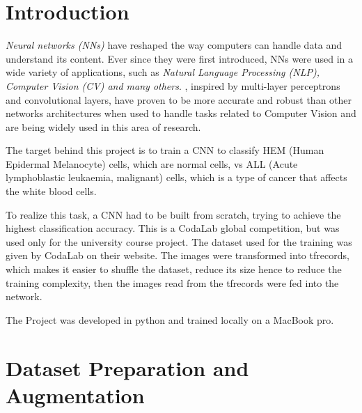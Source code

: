 \documentclass{article}
\begin{document}
\begin{adjustwidth}{-40pt}{-40pt}
\section{Introduction}

{\textit{Neural networks (NNs)}} have reshaped the way computers can handle data and understand its content. Ever since they were first introduced, NNs were used in a wide variety of applications, such as {\textit{Natural Language Processing (NLP), Computer Vision (CV) and many others}}. {}, inspired by multi-layer perceptrons and convolutional layers, have proven to be more  accurate and robust than other networks architectures when used to handle tasks related to Computer Vision and are being widely used in this area of research.

The target behind this project is to train a CNN to classify HEM (Human Epidermal Melanocyte) cells, which are normal cells, vs ALL (Acute lymphoblastic leukaemia, malignant) cells, which is a type of cancer that affects the white blood cells.

To realize this task, a CNN had to be built from scratch, trying to achieve the highest classification accuracy. This is a CodaLab global competition, but was used only for the university course project. The dataset used for the training was given by CodaLab on their website. The images were transformed into tfrecords, which makes it easier to shuffle the dataset, reduce its size hence to reduce the training complexity, then the images read from the tfrecords were fed into the network.

The Project was developed in python and trained locally on a MacBook pro.



\section{Dataset Preparation and Augmentation}


\end{adjustwidth}
\end{document}
